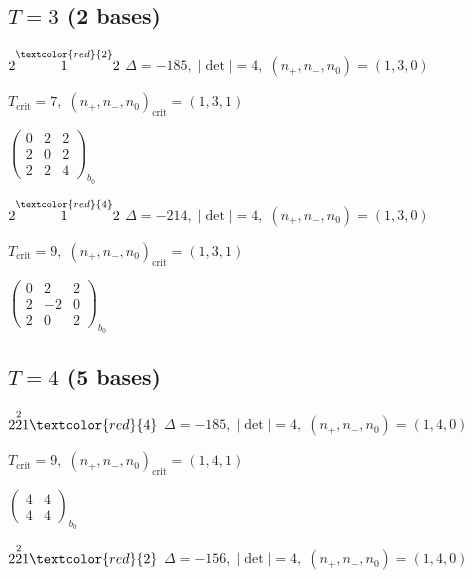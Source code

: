 \documentclass[10pt]{article}
\begin{document}
\newpage

\subsection*{$T = 3$ \quad (2 bases)}
\smallskip

$2\overset{\textcolor{red}{2}}{1}2$ \quad $\Delta=-185,\; |\det|=4,\; (n_+,n_-,n_0)=(1,3,0)$

\hspace{1em}$T_{\text{crit}}=7,\; (n_+,n_-,n_0)_{\text{crit}}=(1,3,1)$

\hspace{2em}$\left(\begin{smallmatrix}0 & 2 & 2 \\ 2 & 0 & 2 \\ 2 & 2 & 4\end{smallmatrix}\right)_{\!b_0}$

$2\overset{\textcolor{red}{4}}{1}2$ \quad $\Delta=-214,\; |\det|=4,\; (n_+,n_-,n_0)=(1,3,0)$

\hspace{1em}$T_{\text{crit}}=9,\; (n_+,n_-,n_0)_{\text{crit}}=(1,3,1)$

\hspace{2em}$\left(\begin{smallmatrix}0 & 2 & 2 \\ 2 & -2 & 0 \\ 2 & 0 & 2\end{smallmatrix}\right)_{\!b_0}$


\subsection*{$T = 4$ \quad (5 bases)}
\smallskip

$2\overset{2}{2}1\textcolor{red}{4}$ \quad $\Delta=-185,\; |\det|=4,\; (n_+,n_-,n_0)=(1,4,0)$

\hspace{1em}$T_{\text{crit}}=9,\; (n_+,n_-,n_0)_{\text{crit}}=(1,4,1)$

\hspace{2em}$\left(\begin{smallmatrix}4 & 4 \\ 4 & 4\end{smallmatrix}\right)_{\!b_0}$

$2\overset{2}{2}1\textcolor{red}{2}$ \quad $\Delta=-156,\; |\det|=4,\; (n_+,n_-,n_0)=(1,4,0)$
\end{document}
